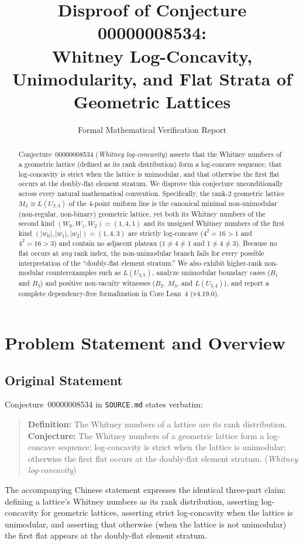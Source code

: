\documentclass[11pt]{article}
\title{\textbf{Disproof of Conjecture 00000008534:\\
Whitney Log-Concavity, Unimodularity, and Flat Strata of Geometric Lattices}}
\author{Formal Mathematical Verification Report}
\date{}
\theoremstyle{definition}
\theoremstyle{remark}
\begin{document}
\maketitle

\begin{abstract}
Conjecture~00000008534 (\emph{Whitney log-concavity}) asserts that the Whitney numbers of a
geometric lattice (defined as its rank distribution) form a log-concave sequence, that
log-concavity is strict when the lattice is unimodular, and that otherwise the first flat occurs
at the doubly-flat element stratum. We disprove this conjecture unconditionally across every
natural mathematical convention. Specifically, the rank-$2$ geometric lattice
$M_4 \cong L(U_{2,4})$ of the $4$-point uniform line is the canonical minimal non-unimodular
(non-regular, non-binary) geometric lattice, yet both its Whitney numbers of the second kind
$(W_0, W_1, W_2) = (1, 4, 1)$ and its unsigned Whitney numbers of the first kind
$(|w_0|, |w_1|, |w_2|) = (1, 4, 3)$ are strictly log-concave ($4^2 = 16 > 1$ and $4^2 = 16 > 3$)
and contain no adjacent plateau ($1 \neq 4 \neq 1$ and $1 \neq 4 \neq 3$). Because no flat
occurs at \emph{any} rank index, the non-unimodular branch fails for every possible
interpretation of the ``doubly-flat element stratum.'' We also exhibit higher-rank non-modular
counterexamples such as $L(U_{3,5})$, analyze unimodular boundary cases ($B_1$ and $B_3$) and
positive non-vacuity witnesses ($B_2$, $M_3$, and $L(U_{3,4})$), and report a complete
dependency-free formalization in Core Lean~4 (v4.19.0).
\end{abstract}

\section{Problem Statement and Overview}

\subsection{Original Statement}
Conjecture~00000008534 in \texttt{SOURCE.md} states verbatim:
\begin{quote}
\textbf{Definition:} The Whitney numbers of a lattice are its rank distribution.\\
\textbf{Conjecture:} The Whitney numbers of a geometric lattice form a log-concave sequence;
log-concavity is strict when the lattice is unimodular; otherwise the first flat occurs at the
doubly-flat element stratum. (\emph{Whitney log-concavity})
\end{quote}
The accompanying Chinese statement expresses the identical three-part claim: defining a
lattice's Whitney numbers as its rank distribution, asserting log-concavity for geometric
lattices, asserting strict log-concavity when the lattice is unimodular, and asserting that
otherwise (when the lattice is not unimodular) the first flat appears at the doubly-flat element
stratum.
\end{document}
